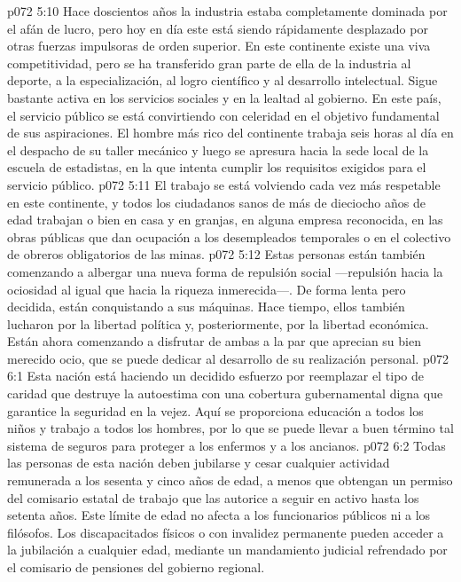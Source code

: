 \vs p072 5:10 \pc Hace doscientos años la industria estaba completamente dominada por el afán de lucro, pero hoy en día este está siendo rápidamente desplazado por otras fuerzas impulsoras de orden superior. En este continente existe una viva competitividad, pero se ha transferido gran parte de ella de la industria al deporte, a la especialización, al logro científico y al desarrollo intelectual. Sigue bastante activa en los servicios sociales y en la lealtad al gobierno. En este país, el servicio público se está convirtiendo con celeridad en el objetivo fundamental de sus aspiraciones. El hombre más rico del continente trabaja seis horas al día en el despacho de su taller mecánico y luego se apresura hacia la sede local de la escuela de estadistas, en la que intenta cumplir los requisitos exigidos para el servicio público.
\vs p072 5:11 El trabajo se está volviendo cada vez más respetable en este continente, y todos los ciudadanos sanos de más de dieciocho años de edad trabajan o bien en casa y en granjas, en alguna empresa reconocida, en las obras públicas que dan ocupación a los desempleados temporales o en el colectivo de obreros obligatorios de las minas.
\vs p072 5:12 Estas personas están también comenzando a albergar una nueva forma de repulsión social ---repulsión hacia la ociosidad al igual que hacia la riqueza inmerecida---. De forma lenta pero decidida, están conquistando a sus máquinas. Hace tiempo, ellos también lucharon por la libertad política y, posteriormente, por la libertad económica. Están ahora comenzando a disfrutar de ambas a la par que aprecian su bien merecido ocio, que se puede dedicar al desarrollo de su realización personal.
\vs p072 6:1 Esta nación está haciendo un decidido esfuerzo por reemplazar el tipo de caridad que destruye la autoestima con una cobertura gubernamental digna que garantice la seguridad en la vejez. Aquí se proporciona educación a todos los niños y trabajo a todos los hombres, por lo que se puede llevar a buen término tal sistema de seguros para proteger a los enfermos y a los ancianos.
\vs p072 6:2 Todas las personas de esta nación deben jubilarse y cesar cualquier actividad remunerada a los sesenta y cinco años de edad, a menos que obtengan un permiso del comisario estatal de trabajo que las autorice a seguir en activo hasta los setenta años. Este límite de edad no afecta a los funcionarios públicos ni a los filósofos. Los discapacitados físicos o con invalidez permanente pueden acceder a la jubilación a cualquier edad, mediante un mandamiento judicial refrendado por el comisario de pensiones del gobierno regional.
